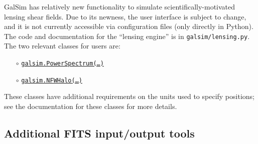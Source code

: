 \documentclass[preprint,11pt]{../../devel/modules/aastex}
\begin{document}
GalSim has relatively new functionality to simulate scientifically-motivated
lensing shear fields. Due to its newness, the user interface is subject to
change, and it is not currently accessible via configuration files (only
directly in Python).  The code and documentation for the ``lensing engine'' is
in {\tt galsim/lensing.py}.  The two relevant classes for users are:

\begin{itemize}
\item[$\circ$]
  \href{http://galsim-developers.github.com/GalSim/classgalsim_1_1lensing_1_1_power_spectrum.html}{\texttt{galsim.PowerSpectrum(\dots)}}

\item[$\circ$]
  \href{http://galsim-developers.github.com/GalSim/classgalsim_1_1lensing_1_1_n_f_w_halo.html}{\texttt{galsim.NFWHalo(\dots)}}
\end{itemize}

These classes have additional requirements on the units used to specify
positions; see the documentation for these classes for more details.

\subsection{Additional FITS input/output tools}\label{sect:multifits}
\end{document}
